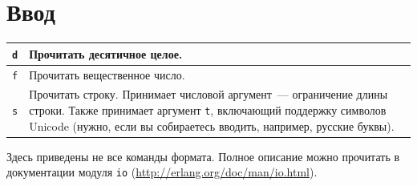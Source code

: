 \documentclass[
  paper=a4,
  fontsize=14pt,
  openany,
  appendixprefix=true
]{scrbook}
\begin{document}
\section*{Ввод}

\begin{longtabu} to \linewidth {|X|X[2.8]|}
  \hline
  \lstinline{d} & Прочитать десятичное целое.\\
  \hline
  \lstinline{f} & Прочитать вещественное число.\\
  \hline
  \lstinline{s} & Прочитать строку. Принимает числовой аргумент~--- ограничение длины строки. Также принимает аргумент \lstinline{t}, включающий поддержку символов Unicode (нужно, если вы собираетесь вводить, например, русские буквы).\vspace{1ex}\\
  \hline
\end{longtabu}

Здесь приведены не все команды формата. Полное описание можно прочитать в документации модуля \lstinline{io} (\url{http://erlang.org/doc/man/io.html}).

\pagebreak %

\end{document}
